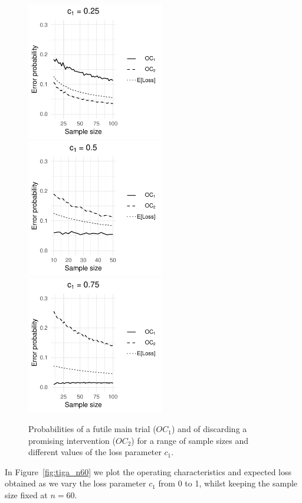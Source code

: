 \documentclass{article} %
\begin{document}
\begin{figure}
\begin{multicols}{3}
\centering
\includegraphics[height=6cm, trim={0 0 2.5cm 0},clip]{./Figures/tiga_c025}
\includegraphics[height=6cm, trim={0.7cm 0 2.5cm 0},clip]{./Figures/tiga_c05}
\includegraphics[height=6cm, trim={0.7cm 0 0 0},clip]{./Figures/tiga_c075}
\end{multicols}
\caption{Probabilities of a futile main trial ($OC_1$) and of discarding a promising intervention ($OC_2$) for a range of sample sizes and different values of the loss parameter $c_1$.}
\label{fig:tiga_ocs}
\end{figure}

In Figure~\ref{fig:tiga_n60} we plot the operating characteristics and expected loss obtained as we vary the loss parameter $c_1$ from 0 to 1, whilst keeping the sample size fixed at $n=60$.
\end{document}
